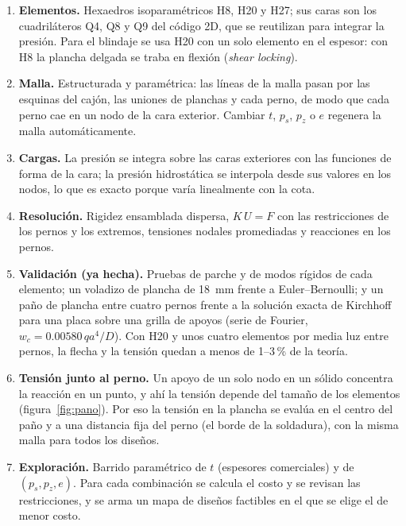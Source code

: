 \documentclass[11pt]{article}
\begin{document}
\begin{enumerate}[leftmargin=1.3em, itemsep=3pt]
  \item \textbf{Elementos.} Hexaedros isoparam\'etricos H8, H20 y H27; sus caras son los
        cuadril\'ateros Q4, Q8 y Q9 del c\'odigo 2D, que se reutilizan para integrar la presi\'on. Para
        el blindaje se usa H20 con un solo elemento en el espesor: con H8 la plancha delgada se traba en
        flexi\'on (\emph{shear locking}).
  \item \textbf{Malla.} Estructurada y param\'etrica: las l\'ineas de la malla pasan por las esquinas
        del caj\'on, las uniones de planchas y cada perno, de modo que cada perno cae en un nodo de la
        cara exterior. Cambiar $t$, $p_s$, $p_z$ o $e$ regenera la malla autom\'aticamente.
  \item \textbf{Cargas.} La presi\'on se integra sobre las caras exteriores con las funciones de forma de
        la cara; la presi\'on hidrost\'atica se interpola desde sus valores en los nodos, lo que es exacto
        porque var\'ia linealmente con la cota.
  \item \textbf{Resoluci\'on.} Rigidez ensamblada dispersa, $K\,U = F$ con las restricciones de los
        pernos y los extremos, tensiones nodales promediadas y reacciones en los pernos.
  \item \textbf{Validaci\'on (ya hecha).} Pruebas de parche y de modos r\'igidos de cada elemento; un
        voladizo de plancha de 18~mm frente a Euler--Bernoulli; y un pa\~no de plancha entre cuatro
        pernos frente a la soluci\'on exacta de Kirchhoff para una placa sobre una grilla de apoyos
        (serie de Fourier, $w_c = 0.00580\,q a^4/D$). Con H20 y unos cuatro elementos por media luz
        entre pernos, la flecha y la tensi\'on quedan a menos de 1--3\,\% de la teor\'ia.
  \item \textbf{Tensi\'on junto al perno.} Un apoyo de un solo nodo en un s\'olido concentra la
        reacci\'on en un punto, y ah\'i la tensi\'on depende del tama\~no de los elementos (figura~\ref{fig:pano}).
        Por eso la tensi\'on en la plancha se eval\'ua en el centro del pa\~no y a una distancia fija
        del perno (el borde de la soldadura), con la misma malla para todos los dise\~nos.
  \item \textbf{Exploraci\'on.} Barrido param\'etrico de $t$ (espesores comerciales) y de $(p_s, p_z, e)$.
        Para cada combinaci\'on se calcula el costo y se revisan las restricciones, y se arma un mapa de
        dise\~nos factibles en el que se elige el de menor costo.
\end{enumerate}
\end{document}

